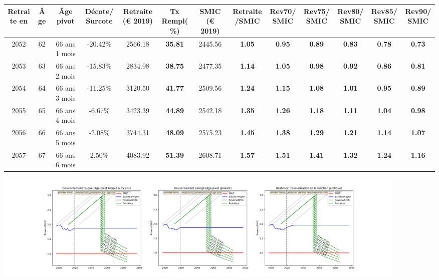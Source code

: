 { \scriptsize \begin{center} 
\begin{tabular}[htb]{|c|c||c|c||c|c||c||c|c|c|c|c|c|} 
\hline 
 Retraite en &  Âge &  Âge pivot &  Décote/Surcote &  Retraite (\euro{} 2019) &  Tx Rempl(\%) &  SMIC (\euro{} 2019) &  Retraite/SMIC &  Rev70/SMIC &  Rev75/SMIC &  Rev80/SMIC &  Rev85/SMIC &  Rev90/SMIC \\ 
\hline \hline 
 2052 &  62 &  66 ans 1 mois &  -20.42\% &  2566.18 &  {\bf 35.81} &  2445.56 &  {\bf 1.05} &  {\bf {\color{red} 0.95}} &  {\bf {\color{red} 0.89}} &  {\bf {\color{red} 0.83}} &  {\bf {\color{red} 0.78}} &  {\bf {\color{red} 0.73}} \\ 
\hline 
 2053 &  63 &  66 ans 2 mois &  -15.83\% &  2834.98 &  {\bf 38.75} &  2477.35 &  {\bf 1.14} &  {\bf 1.05} &  {\bf {\color{red} 0.98}} &  {\bf {\color{red} 0.92}} &  {\bf {\color{red} 0.86}} &  {\bf {\color{red} 0.81}} \\ 
\hline 
 2054 &  64 &  66 ans 3 mois &  -11.25\% &  3120.50 &  {\bf 41.77} &  2509.56 &  {\bf 1.24} &  {\bf 1.15} &  {\bf 1.08} &  {\bf 1.01} &  {\bf {\color{red} 0.95}} &  {\bf {\color{red} 0.89}} \\ 
\hline 
 2055 &  65 &  66 ans 4 mois &  -6.67\% &  3423.39 &  {\bf 44.89} &  2542.18 &  {\bf 1.35} &  {\bf 1.26} &  {\bf 1.18} &  {\bf 1.11} &  {\bf 1.04} &  {\bf {\color{red} 0.98}} \\ 
\hline 
 2056 &  66 &  66 ans 5 mois &  -2.08\% &  3744.31 &  {\bf 48.09} &  2575.23 &  {\bf 1.45} &  {\bf 1.38} &  {\bf 1.29} &  {\bf 1.21} &  {\bf 1.14} &  {\bf 1.07} \\ 
\hline 
 2057 &  67 &  66 ans 6 mois &  2.50\% &  4083.92 &  {\bf 51.39} &  2608.71 &  {\bf 1.57} &  {\bf 1.51} &  {\bf 1.41} &  {\bf 1.32} &  {\bf 1.24} &  {\bf 1.16} \\ 
\hline 
\hline 
\end{tabular} 
\end{center} } 

 \begin{center}\includegraphics[width=0.9\textwidth]{fig/Ascendant23_1990_22_dest_retraite.pdf}\end{center} \label{fig/Ascendant23_1990_22_dest_retraite.pdf} 

